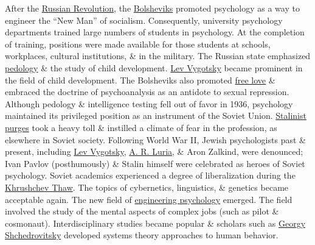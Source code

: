 \documentclass[oneside]{book}
\numberwithin{equation}{section}
\begin{document}
After the \href{https://en.wikipedia.org/wiki/Russian_Revolution}{Russian Revolution}, the \href{https://en.wikipedia.org/wiki/Bolsheviks}{Bolsheviks} promoted psychology as a way to engineer the ``New Man'' of socialism. Consequently, university psychology departments trained large numbers of students in psychology. At the completion of training, positions were made available for those students at schools, workplaces, cultural institutions, \& in the military. The Russian state emphasized \href{https://en.wikipedia.org/wiki/Pedology_(children_study)}{pedology} \& the study of child development. \href{https://en.wikipedia.org/wiki/Lev_Vygotsky}{Lev Vygotsky} became prominent in the field of child development. The Bolsheviks also promoted \href{https://en.wikipedia.org/wiki/Free_love}{free love} \& embraced the doctrine of psychoanalysis as an antidote to sexual repression. Although pedology \& intelligence testing fell out of favor in 1936, psychology maintained its privileged position as an instrument of the Soviet Union. \href{https://en.wikipedia.org/wiki/Stalinist_purges}{Stalinist purges} took a heavy toll \& instilled a climate of fear in the profession, as elsewhere in Soviet society. Following World War II, Jewish psychologists past \& present, including \href{https://en.wikipedia.org/wiki/Lev_Vygotsky}{Lev Vygotsky}, \href{https://en.wikipedia.org/wiki/Alexander_Luria}{A. R. Luria}, \& Aron Zalkind, were denounced; Ivan Pavlov (posthumously) \& Stalin himself were celebrated as heroes of Soviet psychology. Soviet academics experienced a degree of liberalization during the \href{https://en.wikipedia.org/wiki/Khrushchev_Thaw}{Khrushchev Thaw}. The topics of cybernetics, linguistics, \& genetics became acceptable again. The new field of \href{https://en.wikipedia.org/wiki/Engineering_psychology}{engineering psychology} emerged. The field involved the study of the mental aspects of complex jobs (such as pilot \& cosmonaut). Interdisciplinary studies became popular \& scholars such as \href{https://en.wikipedia.org/wiki/Georgy_Shchedrovitsky}{Georgy Shchedrovitsky} developed systems theory approaches to human behavior.
\end{document}
